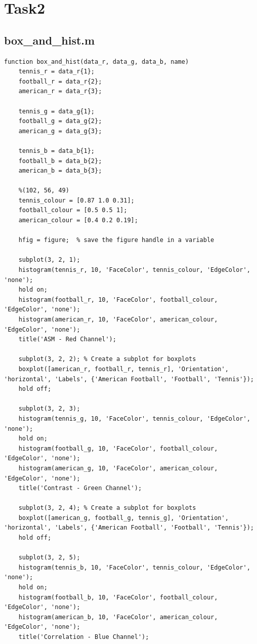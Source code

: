 \documentclass[conference]{IEEEtran}
\begin{document}
    \section{Task2}
        \subsection{box\_and\_hist.m}
            \begin{lstlisting}[style=Matlab-editor, basicstyle=\scriptsize]
function box_and_hist(data_r, data_g, data_b, name)
    tennis_r = data_r{1};
    football_r = data_r{2};
    american_r = data_r{3};

    tennis_g = data_g{1};
    football_g = data_g{2};
    american_g = data_g{3};

    tennis_b = data_b{1};
    football_b = data_b{2};
    american_b = data_b{3};

    %(102, 56, 49)
    tennis_colour = [0.87 1.0 0.31];
    football_colour = [0.5 0.5 1];
    american_colour = [0.4 0.2 0.19];

    hfig = figure;  % save the figure handle in a variable   

    subplot(3, 2, 1);
    histogram(tennis_r, 10, 'FaceColor', tennis_colour, 'EdgeColor', 'none');
    hold on;
    histogram(football_r, 10, 'FaceColor', football_colour, 'EdgeColor', 'none');
    histogram(american_r, 10, 'FaceColor', american_colour, 'EdgeColor', 'none');
    title('ASM - Red Channel');

    subplot(3, 2, 2); % Create a subplot for boxplots
    boxplot([american_r, football_r, tennis_r], 'Orientation', 'horizontal', 'Labels', {'American Football', 'Football', 'Tennis'});
    hold off;
    
    subplot(3, 2, 3);
    histogram(tennis_g, 10, 'FaceColor', tennis_colour, 'EdgeColor', 'none');
    hold on;
    histogram(football_g, 10, 'FaceColor', football_colour, 'EdgeColor', 'none');
    histogram(american_g, 10, 'FaceColor', american_colour, 'EdgeColor', 'none');
    title('Contrast - Green Channel');

    subplot(3, 2, 4); % Create a subplot for boxplots
    boxplot([american_g, football_g, tennis_g], 'Orientation', 'horizontal', 'Labels', {'American Football', 'Football', 'Tennis'});
    hold off;

    subplot(3, 2, 5);
    histogram(tennis_b, 10, 'FaceColor', tennis_colour, 'EdgeColor', 'none');
    hold on;
    histogram(football_b, 10, 'FaceColor', football_colour, 'EdgeColor', 'none');
    histogram(american_b, 10, 'FaceColor', american_colour, 'EdgeColor', 'none');
    title('Correlation - Blue Channel');


\end{lstlisting}
\end{document}
